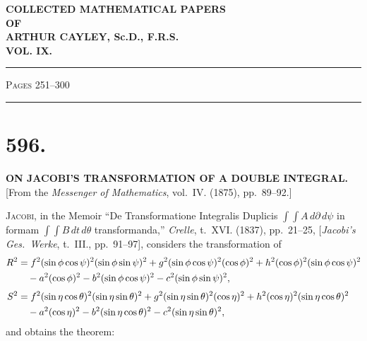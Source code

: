 \documentclass[11pt,a4paper]{book}
\begin{document}
\newpage
\clearpage


\begin{center}
{\LARGE\bfseries COLLECTED MATHEMATICAL PAPERS\\[0.5em]
OF\\[0.5em]
ARTHUR CAYLEY, Sc.D., F.R.S.\\[1em]
VOL. IX.}
\end{center}

\vspace{2em}

\begin{center}
\rule{0.8\textwidth}{0.4pt}

\vspace{1em}
{\Large\scshape Pages 251--300}

\vspace{0.5em}
\rule{0.8\textwidth}{0.4pt}
\end{center}

\vspace{2em}

\section*{596.}
\begin{center}
{\large\bfseries ON JACOBI'S TRANSFORMATION OF A DOUBLE INTEGRAL.}\\[0.5em]
[From the \textit{Messenger of Mathematics}, vol.~IV. (1875), pp.~89--92.]
\end{center}

\textsc{Jacobi}, in the Memoir ``De Transformatione Integralis Duplicis
$\int\!\!\int A\,d\partial\,d\psi$ in formam $\int\!\!\int B\,dt\,d\theta$
transformanda,'' \textit{Crelle}, t.~XVI. (1837), pp.~21--25,
[\textit{Jacobi's Ges.\ Werke}, t.~III., pp.~91--97], considers the
transformation of
%
\begin{align*}
R^2 &= f^2(\sin\phi\cos\psi)^2(\sin\phi\sin\psi)^2
     + g^2(\sin\phi\cos\psi)^2(\cos\phi)^2
     + h^2(\cos\phi)^2(\sin\phi\cos\psi)^2 \\
    &\quad - a^2(\cos\phi)^2 - b^2(\sin\phi\cos\psi)^2 - c^2(\sin\phi\sin\psi)^2,\\[
\jot]
S^2 &= f^2(\sin\eta\cos\theta)^2(\sin\eta\sin\theta)^2
     + g^2(\sin\eta\sin\theta)^2(\cos\eta)^2
     + h^2(\cos\eta)^2(\sin\eta\cos\theta)^2 \\
    &\quad - a^2(\cos\eta)^2 - b^2(\sin\eta\cos\theta)^2 - c^2(\sin\eta\sin\theta)^2,
\end{align*}
%
and obtains the theorem:
\end{document}
